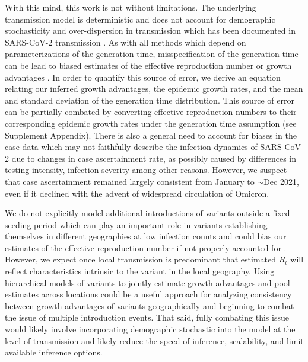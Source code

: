 \documentclass[11pt,oneside,letterpaper]{article}
\begin{document}
With this mind, this work is not without limitations.
The underlying transmission model is deterministic and does not account for demographic stochasticity and over-dispersion in transmission which has been documented in SARS-CoV-2 transmission \cite{Wong29416}.
As with all methods which depend on parameterizations of the generation time, misspecification of the generation time can be lead to biased estimates of the effective reproduction number or growth advantages \cite{Gostic2020}.
In order to quantify this source of error, we derive an equation relating our inferred growth advantages, the epidemic growth rates, and the mean and standard deviation of the generation time distribution.
This source of error can be partially combated by converting effective reproduction numbers to their corresponding epidemic growth rates under the generation time assumption (see Supplement Appendix).
There is also a general need to account for biases in the case data which may not faithfully describe the infection dynamics of SARS-CoV-2 due to changes in case ascertainment rate, as possibly caused by differences in testing intensity, infection severity among other reasons.
However, we suspect that case ascertainment remained largely consistent from January to $\sim$Dec 2021, even if it declined with the advent of widespread circulation of Omicron.

We do not explicitly model additional introductions of variants outside a fixed seeding period which can play an important role in variants establishing themselves in different geographies at low infection counts and could bias our estimates of the effective reproduction number if not properly accounted for \cite{Cori2013, MullerWagner2021}.
However, we expect once local transmission is predominant that estimated $R_{t}$ will reflect characteristics intrinsic to the variant in the local geography.
Using hierarchical models of variants to jointly estimate growth advantages and pool estimates across locations could be a useful approach for analyzing consistency between growth advantages of variants geographically and beginning to combat the issue of multiple introduction events.
That said, fully combating this issue would likely involve incorporating demographic stochastic into the model at the level of transmission and likely reduce the speed of inference, scalability, and limit available inference options.
\end{document}

